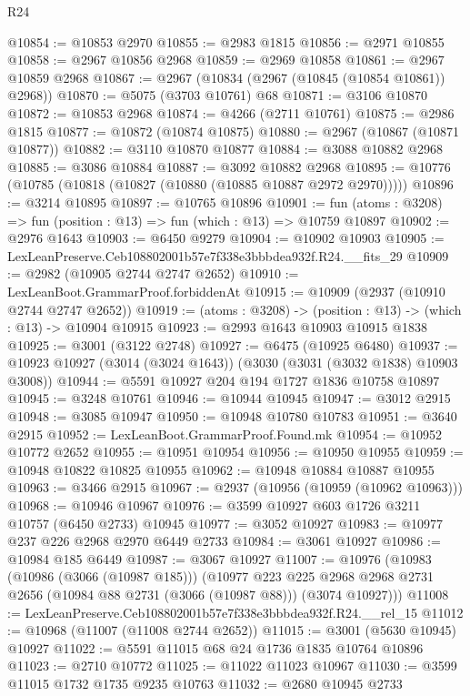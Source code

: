 \begin{lexlean}{R24}
\begin{coremodule}
@10854 := @10853 @2970
@10855 := @2983 @1815
@10856 := @2971 @10855
@10858 := @2967 @10856 @2968
@10859 := @2969 @10858
@10861 := @2967 @10859 @2968
@10867 := @2967 (@10834 (@2967 (@10845 (@10854 @10861)) @2968))
@10870 := @5075 (@3703 @10761) @68
@10871 := @3106 @10870
@10872 := @10853 @2968
@10874 := @4266 (@2711 @10761)
@10875 := @2986 @1815
@10877 := @10872 (@10874 @10875)
@10880 := @2967 (@10867 (@10871 @10877))
@10882 := @3110 @10870 @10877
@10884 := @3088 @10882 @2968
@10885 := @3086 @10884
@10887 := @3092 @10882 @2968
@10895 := @10776 (@10785 (@10818 (@10827 (@10880 (@10885 @10887 @2972 @2970)))))
@10896 := @3214 @10895
@10897 := @10765 @10896
@10901 := fun (atoms : @3208) => fun (position : @13) => fun (which : @13) => @10759 @10897
@10902 := @2976 @1643
@10903 := @6450 @9279
@10904 := @10902 @10903
@10905 := LexLeanPreserve.Ceb108802001b57e7f338e3bbbdea932f.R24.__fits_29
@10909 := @2982 (@10905 @2744 @2747 @2652)
@10910 := LexLeanBoot.GrammarProof.forbiddenAt
@10915 := @10909 (@2937 (@10910 @2744 @2747 @2652))
@10919 := (atoms : @3208) -> (position : @13) -> (which : @13) -> @10904 @10915
@10923 := @2993 @1643 @10903 @10915 @1838
@10925 := @3001 (@3122 @2748)
@10927 := @6475 (@10925 @6480)
@10937 := @10923 @10927 (@3014 (@3024 @1643)) (@3030 (@3031 (@3032 @1838) @10903 @3008))
@10944 := @5591 @10927 @204 @194 @1727 @1836 @10758 @10897
@10945 := @3248 @10761
@10946 := @10944 @10945
@10947 := @3012 @2915
@10948 := @3085 @10947
@10950 := @10948 @10780 @10783
@10951 := @3640 @2915
@10952 := LexLeanBoot.GrammarProof.Found.mk
@10954 := @10952 @10772 @2652
@10955 := @10951 @10954
@10956 := @10950 @10955
@10959 := @10948 @10822 @10825 @10955
@10962 := @10948 @10884 @10887 @10955
@10963 := @3466 @2915
@10967 := @2937 (@10956 (@10959 (@10962 @10963)))
@10968 := @10946 @10967
@10976 := @3599 @10927 @603 @1726 @3211 @10757 (@6450 @2733) @10945
@10977 := @3052 @10927
@10983 := @10977 @237 @226 @2968 @2970 @6449 @2733
@10984 := @3061 @10927
@10986 := @10984 @185 @6449
@10987 := @3067 @10927
@11007 := @10976
    (@10983
      (@10986 (@3066 (@10987 @185)))
      (@10977
        @223
        @225
        @2968
        @2968
        @2731
        @2656
        (@10984 @88 @2731 (@3066 (@10987 @88)))
        (@3074 @10927)))
@11008 := LexLeanPreserve.Ceb108802001b57e7f338e3bbbdea932f.R24.__rel_15
@11012 := @10968 (@11007 (@11008 @2744 @2652))
@11015 := @3001 (@5630 @10945) @10927
@11022 := @5591 @11015 @68 @24 @1736 @1835 @10764 @10896
@11023 := @2710 @10772
@11025 := @11022 @11023 @10967
@11030 := @3599 @11015 @1732 @1735 @9235 @10763
@11032 := @2680 @10945 @2733

\end{coremodule}
\end{lexlean}
